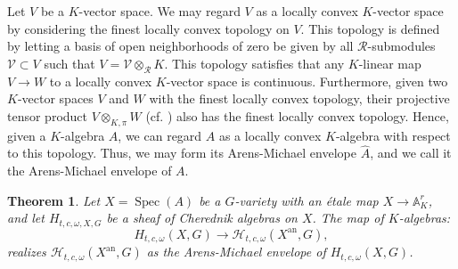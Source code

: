 \documentclass{amsart}
\newtheorem{teo}[defi]{ Theorem}
\newcommand{\Spec}{\operatorname{Spec}}
\begin{document}
Let $V$ be a $K$-vector space. We may regard $V$ as a locally convex $K$-vector space by considering the finest locally convex topology on $V$. This topology is defined by letting a basis of open neighborhoods of zero be given by all $\mathcal{R}$-submodules
$\mathcal{V}\subset V$ such that $V=\mathcal{V}\otimes_{\mathcal{R}}K$. This topology satisfies that any $K$-linear map $V\rightarrow W$ to a locally convex $K$-vector space is continuous. Furthermore, given two $K$-vector spaces $V$ and $W$ with the finest locally convex topology, their projective tensor product $V\otimes_{K,\pi} W$ (cf. \cite[Chaper IV 17.B]{schneider2013nonarchimedean}) also has the finest locally convex topology. Hence, given a $K$-algebra $A$, we can regard $A$ as a locally convex $K$-algebra with respect to this topology. Thus, we may form its Arens-Michael envelope $\widehat{A}$, and we call it the Arens-Michael envelope of $A$.
 \begin{teo}\label{teo GAGA and Arens-Michaels envelopes}
Let $X=\Spec(A)$ be a $G$-variety with an étale map $X\rightarrow \mathbb{A}^r_K$, and let $H_{t,c,\omega,X,G}$ be a sheaf of Cherednik algebras on $X$. The  map of $K$-algebras:
\begin{equation*}
    H_{t,c,\omega}(X,G)\rightarrow \mathcal{H}_{t,c,\omega}(X^{\operatorname{an}},G),
\end{equation*}
realizes
$\mathcal{H}_{t,c,\omega}(X^{\operatorname{an}},G)$ as the Arens-Michael envelope of $H_{t,c,\omega}(X,G)$.
 \end{teo}
\end{document}
